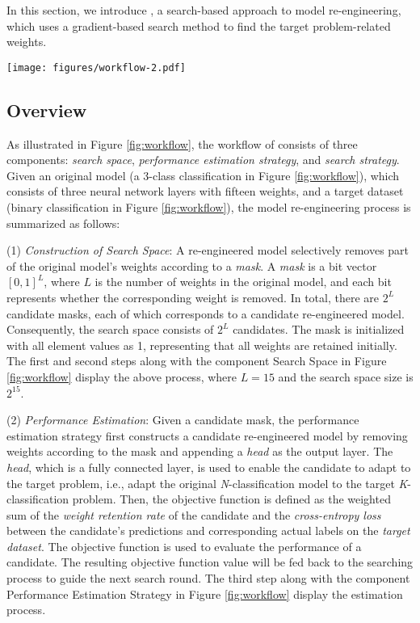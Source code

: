 In this section, we introduce \projectName, a search-based approach to model re-engineering, which uses a gradient-based search method to find the target problem-related weights.

\begin{figure*}[t]
    \centering
    \texttt{[image: figures/workflow-2.pdf]}
    \caption{The workflow of model re-engineering with \projectName.}
    \label{fig:workflow}
\end{figure*}

\subsection{Overview}
As illustrated in Figure \ref{fig:workflow}, the workflow of \projectName consists of three components: \textit{search space}, \textit{performance estimation strategy}, and \textit{search strategy}. 
Given an original model (a 3-class classification in Figure \ref{fig:workflow}), which consists of three neural network layers with fifteen weights, and a target dataset (binary classification in Figure \ref{fig:workflow}), the model re-engineering process is summarized as follows:

(1) \textit{Construction of Search Space}: A re-engineered model selectively removes part of the original model's weights according to a \textit{mask}. 
A \textit{mask} is a bit vector $[0,1]^L$, where $L$ is the number of weights in the original model, and each bit represents whether the corresponding weight is removed. 
In total, there are $2^L$ candidate masks, each of which corresponds to a candidate re-engineered model.
Consequently, the search space consists of $2^L$ candidates.
The mask is initialized with all element values as 1, representing that all weights are retained initially.
The first and second steps along with the component Search Space in Figure \ref{fig:workflow} display the above process, where $L=15$ and the search space size is $2^{15}$.

(2) \textit{Performance Estimation}: Given a candidate mask, the performance estimation strategy first constructs a candidate re-engineered model by removing weights according to the mask and appending a \textit{head} as the output layer.
The \textit{head}, which is a fully connected layer, is used to enable the candidate to adapt to the target problem, i.e., adapt the original \textit{N}-classification model to the target \textit{K}-classification problem.
Then, the objective function is defined as the weighted sum of the \textit{weight retention rate} of the candidate and the \textit{cross-entropy loss} between the candidate's predictions and corresponding actual labels on the \textit{target dataset}.
The objective function is used to evaluate the performance of a candidate. 
The resulting objective function value will be fed back to the searching process to guide the next search round. %
The third step along with the component Performance Estimation Strategy in Figure \ref{fig:workflow} display the estimation process.

